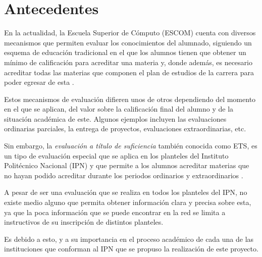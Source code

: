 
\section{Antecedentes}

En la actualidad, la Escuela Superior de Cómputo (ESCOM) cuenta con diversos mecanismos que permiten evaluar los conocimientos del alumnado, siguiendo un esquema de educación tradicional en el que los alumnos tienen que obtener un mínimo de calificación para acreditar una materia y, donde además, es necesario acreditar todas las materias que componen el plan de estudios de la carrera para poder egresar de esta \cite{L01}.

Estos mecanismos de evaluación difieren unos de otros dependiendo del momento en el que se aplican, del valor sobre la calificación final del alumno y de la situación académica de este. Algunos ejemplos incluyen las evaluaciones ordinarias parciales, la entrega de proyectos, evaluaciones extraordinarias, etc. 

Sin embargo, la \textit{evaluación a título de suficiencia} también conocida como ETS, es un tipo de evaluación especial que se aplica en los planteles del Instituto Politécnico Nacional (IPN) y que permite a los alumnos acreditar materias que no hayan podido acreditar durante los periodos ordinarios y extraordinarios \cite{L02}. 

A pesar de ser una evaluación que se realiza en todos los planteles del IPN, no existe medio alguno que permita obtener información clara y precisa sobre esta, ya que la poca información que se puede encontrar en la red se limita a instructivos de su inscripción de distintos planteles. 

Es debido a esto, y a su importancia en el proceso académico de cada una de las instituciones que conforman al IPN que se propuso la realización de este proyecto. 

 